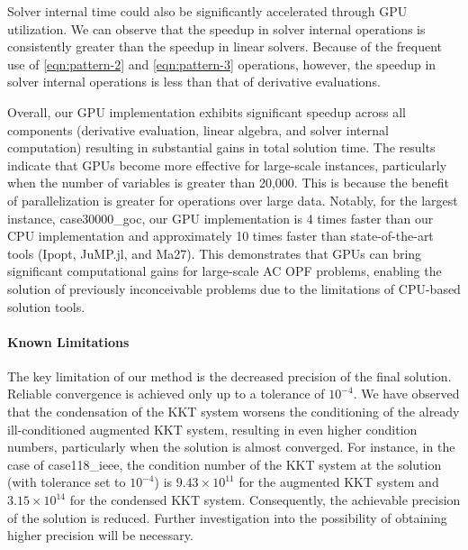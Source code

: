 \documentclass{IEEEtran4PSCC} %
\begin{document}
Solver internal time could also be significantly accelerated through
GPU utilization. We can observe that the speedup in solver internal
operations is consistently greater than the speedup in linear
solvers. Because of the frequent use of \ref{eqn:pattern-2} and
\ref{eqn:pattern-3} operations,  however, the speedup in solver internal
operations is less than that of derivative evaluations.

Overall, our GPU implementation exhibits significant speedup across
all components (derivative evaluation, linear algebra, and solver
internal computation) resulting in substantial gains in total solution
time. The results indicate that GPUs become more effective for
large-scale instances, particularly when the number of variables is
greater than 20,000. {\color{blue} This is because the benefit of parallelization
is greater for operations over large data.}
Notably, for the largest instance,
case30000\_goc, our GPU implementation is 4 times faster than our CPU
implementation and approximately 10 times faster than
state-of-the-art tools (Ipopt, JuMP.jl, and Ma27).
This demonstrates that GPUs can bring significant computational
gains for large-scale AC OPF problems, enabling the solution of
previously inconceivable problems due to the limitations of CPU-based
solution tools.

\paragraph*{Known Limitations}
The key limitation of our method is the decreased precision of the
final solution. Reliable convergence is achieved only up to a
tolerance of $10^{-4}$. We have observed that the condensation of the
KKT system worsens the conditioning of the already ill-conditioned
augmented KKT system, resulting in even higher condition numbers,
particularly when the solution is almost converged. For instance, in
the case of case118\_ieee, the condition number of the KKT system at
the solution (with tolerance set to $10^{-4}$) is $9.43\times 10^{11}$
for the augmented KKT system and $3.15\times 10^{14}$ for the
condensed KKT system. Consequently, the achievable precision of
the solution is reduced. Further investigation into the possibility of
obtaining higher precision will be necessary.
\end{document}

